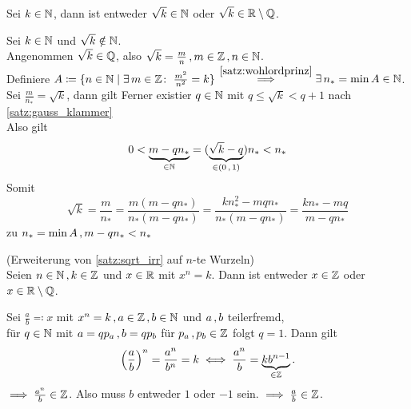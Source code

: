 \documentclass[../ana1.tex]{subfiles}
\begin{document}
\begin{satz}\label{satz:sqrt_irr}
	Sei \(k \in \mathbb{N} \), dann ist entweder \(\sqrt{k} \in \mathbb{N} \) oder \(\sqrt{k} \in \mathbb{R} \setminus \mathbb{Q} \).
\end{satz}
\begin{bew}
	Sei \(k \in \mathbb{N} \) und \(\sqrt{k} \notin \mathbb{N} \). \\
	Angenommen \(\sqrt{k} \in \mathbb{Q} \), also \(\sqrt{k} = \frac{m}{n} \operatorname{,} m \in \mathbb{Z} \operatorname{,} n \in \mathbb{N} \). \\
	Definiere \(A \coloneqq \{n \in \mathbb{N} \; \vert \; \exists \, m \in \mathbb{Z} \colon \; \frac{m^2}{n^2} = k\} \)
	\(\overset{\autoref{satz:wohlordprinz}}{\implies}\exists \, n_* = \min A \in \N \). \\
	Sei \(\frac{m}{n_*} = \sqrt{k} \), dann gilt
	Ferner existier \(q \in \mathbb{N} \) mit \(q \leq \sqrt{k} < q+1 \) nach \autoref{satz:gauss_klammer} \\
	Also gilt
	\[ 0 < \underbrace{m-qn_*}_{\in \mathbb{N}} = (\underbrace{\sqrt{k}-q}_{\in (0 \operatorname{,} 1)})n_* < n_* \]
	Somit 
	\[ \sqrt{k} = \frac{m}{n_*} = \frac{m(m - qn_*)}{n_*(m - qn_*)} = \frac{kn_*^2 - mqn_*}{n_*(m - qn_*)}=\frac{kn_* - mq}{m - qn_*} \]
	\Lightning{} zu \(n_* = \min A \operatorname{,} m-qn_* < n_* \)
\end{bew}

\iftoggle{short}{}{\newpage}%

\begin{bem}(Erweiterung von \autoref{satz:sqrt_irr} auf \(n \)-te Wurzeln) \leavevmode \\
	Seien \(n \in \mathbb{N} \operatorname{,} k \in \mathbb{Z} \) und \(x \in \mathbb{R} \) mit \(x^n = k \). Dann ist entweder \(x \in \mathbb{Z} \) oder \(x \in \mathbb{R} \setminus \mathbb{Q} \).
\end{bem}
\begin{bew}
	Sei \(\frac{a}{b} \eqqcolon x \) mit \(x^n = k \operatorname{,} a \in \mathbb{Z} \operatorname{,} b \in \mathbb{N} \) und \(a \operatorname{,} b\) teilerfremd, \\
	\dphp{} für \(q \in \mathbb{N} \) mit \(a = qp_a \operatorname{,} b = qp_b \) für \(p_a \operatorname{,} p_b \in \mathbb{Z} \) folgt \(q = 1 \).
	Dann gilt
	\[{\left(\frac{a}{b}\right)}^n = \frac{a^n}{b^n} = k \iff \frac{a^n}{b} = \underbrace{kb^{n - 1}}_{\in \mathbb{Z}}. \]
	\(\implies \frac{a^n}{b} \in \mathbb{Z} \). Also muss \(b \) entweder \(1 \) oder \(\minus 1 \) sein.
	\(\implies \frac{a}{b} \in \mathbb{Z} \).
\end{bew}
\end{document}
